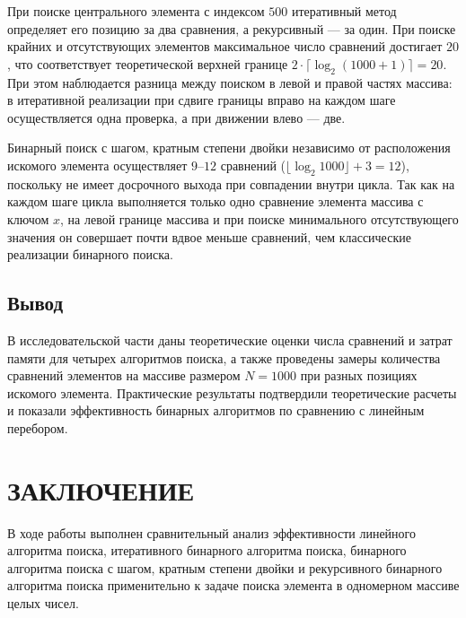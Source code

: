 При поиске центрального элемента с индексом $500$ итеративный
метод определяет его позицию за два сравнения, а рекурсивный --- за один.
При поиске крайних и отсутствующих элементов максимальное число 
сравнений достигает $20$, что соответствует теоретической 
верхней границе $2 \cdot \lceil \log_2(1000 + 1) \rceil = 20$. 
При этом наблюдается разница между поиском в левой и правой 
частях массива: в итеративной реализации при сдвиге границы 
вправо на каждом шаге осуществляется одна проверка, 
а при движении влево --- две.

Бинарный поиск с шагом, кратным степени двойки независимо от 
расположения искомого элемента осуществляет $9\text{--}12$ сравнений 
($\lfloor \log_2 1000 \rfloor + 3 = 12$), поскольку не имеет 
досрочного выхода при совпадении внутри цикла. Так как на каждом 
шаге цикла выполняется только одно сравнение элемента массива 
с ключом $x$, на левой границе массива и при поиске 
минимального отсутствующего значения он совершает почти 
вдвое меньше сравнений, чем классические реализации 
бинарного поиска.

\section*{Вывод}

В исследовательской части даны теоретические оценки числа 
сравнений и затрат памяти для четырех алгоритмов поиска, 
а также проведены замеры количества сравнений элементов на массиве 
размером $N = 1000$ при разных позициях искомого элемента. 
Практические результаты подтвердили теоретические расчеты и 
показали эффективность бинарных алгоритмов по сравнению 
с линейным перебором.

\chapter*{ЗАКЛЮЧЕНИЕ}

В ходе работы выполнен сравнительный анализ эффективности линейного 
алгоритма поиска, итеративного бинарного алгоритма поиска, 
бинарного алгоритма поиска с шагом, кратным степени двойки и 
рекурсивного бинарного алгоритма поиска применительно к задаче 
поиска элемента в одномерном массиве целых чисел.

